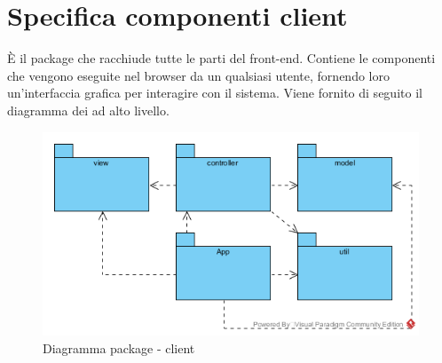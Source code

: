 \section{Specifica componenti client}
È il package che racchiude tutte le parti del front-end. Contiene le componenti che vengono eseguite nel browser da un qualsiasi utente, fornendo loro un'interfaccia grafica per interagire con il sistema.
Viene fornito di seguito il diagramma dei  ad alto livello.
\begin{center}
	\begin{figure}[H]
		\centering \includegraphics[scale=4, max width=\textwidth, max height=\myheight]{../img/diagrammiClassi/architetturaClient.png}
		\caption{Diagramma package - client}
	\end{figure}
\end{center}

